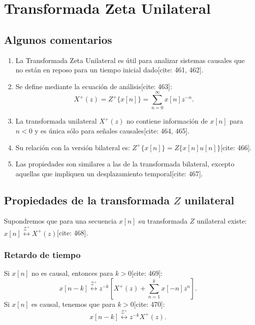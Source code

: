\documentclass[11pt,a4paper,openany]{book}
\begin{document}
\section{Transformada Zeta Unilateral}

\subsection{Algunos comentarios}
\begin{enumerate}
	\item La Transformada Zeta Unilateral es \'{u}til para analizar sistemas causales que no est\'{a}n en reposo para un tiempo inicial dado[cite: 461, 462].
	\item Se define mediante la ecuaci\'{o}n de an\'{a}lisis[cite: 463]:
	\begin{equation}
		X^{+}(z) = Z^{+}\{x[n]\} = \sum_{n=0}^{\infty} x[n] z^{-n}.
	\end{equation}
	\item La transformada unilateral $X^{+}(z)$ no contiene informaci\'{o}n de $x[n]$ para $n<0$ y es \'{u}nica s\'{o}lo para se\~{n}ales causales[cite: 464, 465].
	\item Su relación con la versión bilateral es: $Z^{+}\{x[n]\} = Z\{x[n] u[n]\}$[cite: 466].
	\item Las propiedades son similares a las de la transformada bilateral, excepto aquellas que impliquen un desplazamiento temporal[cite: 467].
\end{enumerate}

\subsection{Propiedades de la transformada $Z$ unilateral}
Supondremos que para una secuencia $x[n]$ su transformada $Z$ unilateral existe: $x[n] \stackrel{\mathcal{Z}^+}{\longleftrightarrow} X^{+}(z)$[cite: 468].

\subsubsection{Retardo de tiempo}
Si $x[n]$ no es causal, entonces para $k > 0$[cite: 469]:
\begin{equation}
	x[n-k] \stackrel{\mathcal{Z}^+}{\longleftrightarrow} z^{-k} \left[ X^{+}(z) + \sum_{n=1}^{k} x[-n] z^{n} \right].
\end{equation}
Si $x[n]$ es causal, tenemos que para $k > 0$[cite: 470]:
\begin{equation}
	x[n-k] \stackrel{\mathcal{Z}^+}{\longleftrightarrow} z^{-k} X^{+}(z).
\end{equation}
\end{document}

